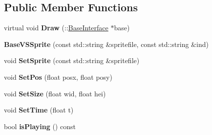 \subsection*{Public Member Functions}
\begin{DoxyCompactItemize}
\item 
virtual void {\bfseries Draw} (\+::\hyperlink{classBaseInterface}{Base\+Interface} $\ast$base)\hypertarget{classBaseInterface_1_1Room_1_1BaseVSSprite_a6d28ecee3ea6154adb574ee7d658aaa2}{}\label{classBaseInterface_1_1Room_1_1BaseVSSprite_a6d28ecee3ea6154adb574ee7d658aaa2}

\item 
{\bfseries Base\+V\+S\+Sprite} (const std\+::string \&spritefile, const std\+::string \&ind)\hypertarget{classBaseInterface_1_1Room_1_1BaseVSSprite_a6aef39b8137cf60617edf5da0b027d86}{}\label{classBaseInterface_1_1Room_1_1BaseVSSprite_a6aef39b8137cf60617edf5da0b027d86}

\item 
void {\bfseries Set\+Sprite} (const std\+::string \&spritefile)\hypertarget{classBaseInterface_1_1Room_1_1BaseVSSprite_a83f52bbad54c99931922bbde5e44d889}{}\label{classBaseInterface_1_1Room_1_1BaseVSSprite_a83f52bbad54c99931922bbde5e44d889}

\item 
void {\bfseries Set\+Pos} (float posx, float posy)\hypertarget{classBaseInterface_1_1Room_1_1BaseVSSprite_a154ca93dfd7e8cb282fe11de25865dde}{}\label{classBaseInterface_1_1Room_1_1BaseVSSprite_a154ca93dfd7e8cb282fe11de25865dde}

\item 
void {\bfseries Set\+Size} (float wid, float hei)\hypertarget{classBaseInterface_1_1Room_1_1BaseVSSprite_a09bfe65ee4bb0220cf9e0f3b18ef93bc}{}\label{classBaseInterface_1_1Room_1_1BaseVSSprite_a09bfe65ee4bb0220cf9e0f3b18ef93bc}

\item 
void {\bfseries Set\+Time} (float t)\hypertarget{classBaseInterface_1_1Room_1_1BaseVSSprite_a48c5db1543d0bc71ea08eeed600a3df0}{}\label{classBaseInterface_1_1Room_1_1BaseVSSprite_a48c5db1543d0bc71ea08eeed600a3df0}

\item 
bool {\bfseries is\+Playing} () const \hypertarget{classBaseInterface_1_1Room_1_1BaseVSSprite_a3e343a374745c690b0471d6de2db85f5}{}\label{classBaseInterface_1_1Room_1_1BaseVSSprite_a3e343a374745c690b0471d6de2db85f5}

\end{DoxyCompactItemize}
